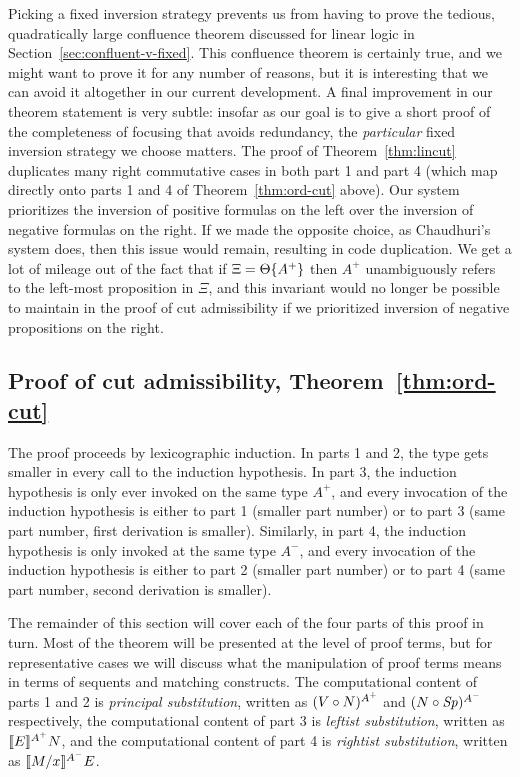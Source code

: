 Picking a fixed inversion strategy prevents us from having to prove
the tedious, quadratically large confluence theorem discussed for linear
logic in Section~\ref{sec:confluent-v-fixed}. %
This confluence theorem is certainly true, and we might want to
prove it for any number of reasons, but it is interesting that we can
avoid it altogether in our current development.  A final improvement
in our theorem statement is very subtle: insofar as our goal is to
give a short proof of the completeness of focusing that avoids
redundancy, the {\it particular} fixed inversion strategy we choose
matters. The proof of Theorem~\ref{thm:lincut} duplicates many right
commutative cases in both part 1 and part 4 (which map directly onto
parts 1 and 4 of Theorem~\ref{thm:ord-cut} above). Our system
prioritizes the inversion of positive formulas on the left over the
inversion of negative formulas on the right. If we made the opposite
choice, as Chaudhuri's system does, then this issue would remain,
resulting in code duplication.  We get a lot of mileage out of the
fact that if $\Xi = \tackon{\Theta}{A^+}$ then $A^+$ unambiguously
refers to the left-most proposition in $\Xi$, and this invariant would
no longer be possible to maintain in the proof of cut admissibility if
we prioritized inversion of negative propositions on the right.


\subsection{Proof of cut admissibility, Theorem~\ref{thm:ord-cut}}

The proof proceeds by lexicographic induction.  In parts 1 and 2, the
type gets smaller in every call to the induction hypothesis. In part
3, the induction hypothesis is only ever invoked on the same type
$A^+$, and every invocation of the induction hypothesis is either to
part 1 (smaller part number) or to part 3 (same part number, first
derivation is smaller). Similarly, in part 4, the induction hypothesis
is only invoked at the same type $A^-$, and every invocation of the
induction hypothesis is either to part 2 (smaller part number) or to
part 4 (same part number, second derivation is smaller).

The remainder of this section will cover each of the four parts of
this proof in turn. Most of the theorem will be presented at the level
of proof terms, but for representative cases we will discuss what the
manipulation of proof terms means in terms of sequents and matching
constructs. The computational content of parts 1 and 2 is {\it
  principal substitution}, written as $(\subst{V}{N})^{A^+}$ and
$(\subst{N}{\Sp})^{A^-}$ respectively, the computational content of
part 3 is {\it leftist substitution}, written as
$\lsubsta{E}{N}{A^+}$, and the computational content of part 4 is {\it
  rightist substitution}, written as $\rsubsta{M}{x}{E}{A^-}$.

